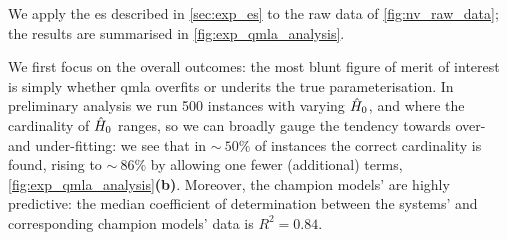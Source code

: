 We apply the \gls{es} described in \cref{sec:exp_es} to the raw data of \cref{fig:nv_raw_data};
    the results are summarised in \cref{fig:exp_qmla_analysis}.
\par 

We first focus on the overall outcomes:
    the most blunt figure of merit of interest is simply whether \gls{qmla}
    overfits or underits the true parameterisation. 
In preliminary analysis we run 500 instances with varying $\hat{H}_0$, 
    and where the cardinality of $\hat{H}_0$ ranges,
    so we can broadly gauge the tendency towards over- and under-fitting:
    we see that in $\sim~50\%$ of instances the correct cardinality is found,  
    rising to $\sim~86\%$ by allowing one fewer (additional) terms, \cref{fig:exp_qmla_analysis}\textbf{(b)}. 
Moreover, the champion models' are highly predictive: 
    the median coefficient of determination between the systems' and corresponding champion models' data is 
    $R^2 = 0.84$. 
\par 

